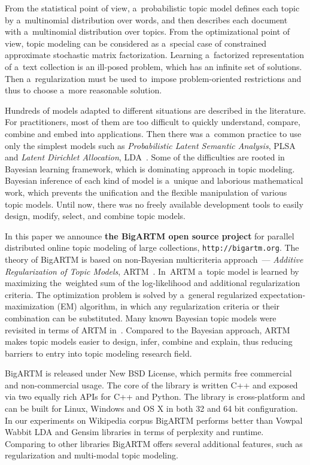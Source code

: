 \documentclass[russian]{llncs}
\begin{document}
From the statistical point of view, a~probabilistic topic model
defines each topic by a~multinomial distribution over words,
and then describes each document with a~multinomial distribution over topics.
From the optimizational point of view,
topic modeling can be considered as a~special case
of constrained approximate stochastic matrix factorization.
Learning a~factorized representation of a~text collection
is an ill-posed problem, which has an infinite set of solutions.
Then a~regularization must be used
to~impose problem-oriented restrictions
and thus to choose a~more reasonable solution.

Hundreds of models adapted to different situations are described in the literature.
For practitioners, most of them are too difficult to quickly
understand, compare, combine and embed into applications.
Then there was a~common practice to use only the simplest models such as
\emph{Probabilistic Latent Semantic Analysis}, PLSA~\cite{hofmann99plsi} and
\emph{Latent Dirichlet Allocation}, LDA~\cite{blei03latent}.
Some of the difficulties are rooted in Bayesian learning framework,
which is dominating approach in topic modeling.
Bayesian inference of each kind of model is a~unique and laborious mathematical work,
which prevents the unification and the flexible manipulation of various topic models.
Until now, there was no freely available development tools
to easily design, modify, select, and combine topic models.

In this paper we announce \textbf{the BigARTM open source project} for
parallel distributed online topic modeling of large collections,
\texttt{http://bigartm.org}.
The theory of BigARTM is based on non-Bayesian multicriteria approach~---
\emph{Additive Regularization of Topic Models}, ARTM~\cite{voron14dan-eng}.
In~ARTM a~topic model is learned by maximizing the~weighted sum
of the log-likelihood and additional regularization criteria.
The optimization problem is solved by a~general regularized expectation-maximization (EM) algorithm,
in which any regularization criteria or their combination can be substituted.
Many known Bayesian topic models were revisited in terms of ARTM in~\cite{voron14aist,voron14mlj}.
Compared to the Bayesian approach,
ARTM makes topic models easier to design, infer, combine and explain,
thus reducing barriers to entry into topic modeling research field.

BigARTM is released under New BSD License, which permits free commercial and non-commercial usage.
The core of the library is written C++ and exposed via two equally rich APIs for C++ and Python.
The library is cross-platform and can be built for Linux, Windows and OS X in both 32 and 64 bit configuration.
In our experiments on Wikipedia corpus BigARTM performs better than Vowpal Wabbit LDA and Gensim libraries
in terms of perplexity and runtime.
Comparing to other libraries BigARTM offers several additional features,
such as regularization and multi-modal topic modeling.
\end{document}
